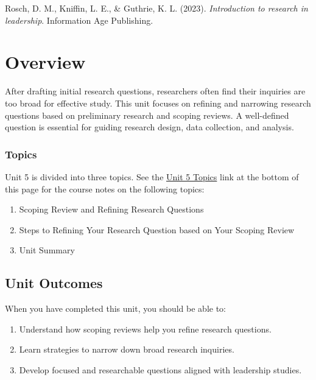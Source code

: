 \documentclass[
  letterpaper,
  DIV=11,
  numbers=noendperiod]{scrreprt}
\providecommand{\tightlist}{%
  \setlength{\itemsep}{0pt}\setlength{\parskip}{0pt}}\usepackage{longtable,booktabs,array}
\begin{document}
Rosch, D. M., Kniffin, L. E., \& Guthrie, K. L. (2023).
\emph{Introduction to research in leadership}. Information Age
Publishing.


\chapter*{Overview}\label{overview-4}


After drafting initial research questions, researchers often find their
inquiries are too broad for effective study. This unit focuses on
refining and narrowing research questions based on preliminary research
and scoping reviews. A well-defined question is essential for guiding
research design, data collection, and analysis.

\subsection*{Topics}\label{topics-4}

Unit 5 is divided into three topics. See the
\href{https://learn.twu.ca/mod/book/view.php?id=1179166}{Unit 5 Topics}
link at the bottom of this page for the course notes on the following
topics:

\begin{enumerate}
\def\labelenumi{\arabic{enumi}.}
\tightlist
\item
  Scoping Review and Refining Research Questions
\item
  Steps to Refining Your Research Question based on Your Scoping Review
\item
  Unit Summary
\end{enumerate}

\section*{Unit Outcomes}\label{unit-outcomes-3}


When you have completed this unit, you should be able to:

\begin{enumerate}
\def\labelenumi{\arabic{enumi}.}
\tightlist
\item
  Understand how scoping reviews help you refine research questions.
\item
  Learn strategies to narrow down broad research inquiries.
\item
  Develop focused and researchable questions aligned with leadership
  studies.
\end{enumerate}
\end{document}
